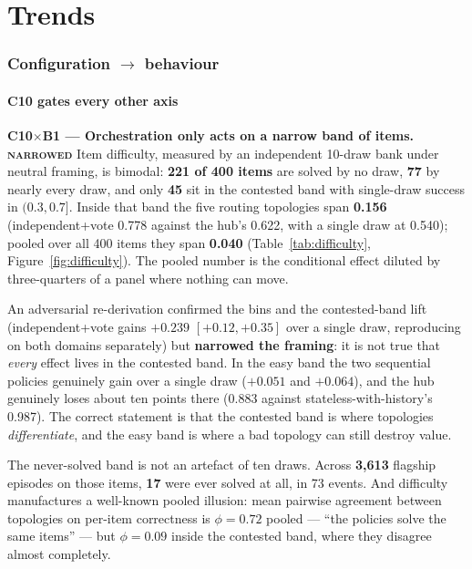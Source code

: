 \documentclass[10pt,a4paper]{article}
\newcommand{\ax}[1]{\textcolor{accent}{\textbf{#1}}}
\newcommand{\bx}[1]{\textcolor{warm}{\textbf{#1}}}
\newcommand{\trend}[1]{\medskip\noindent\textbf{#1}\quad}
\begin{document}
\part{Trends}\label{part:trends}

\section{Configuration \texorpdfstring{$\to$}{->} behaviour}\label{sec:cb}

\subsection{\ax{C10} gates every other axis}\label{sec:difficulty}

\trend{\ax{C10}$\times$\bx{B1} --- Orchestration only acts on a narrow band of items. \textsc{narrowed}}
Item difficulty, measured by an independent 10-draw bank under neutral framing, is bimodal: \textbf{221 of 400 items} are solved by no draw, \textbf{77} by nearly every draw, and only \textbf{45} sit in the contested band with single-draw success in $(0.3,0.7]$. Inside that band the five routing topologies span \textbf{0.156} (independent+vote 0.778 against the hub's 0.622, with a single draw at 0.540); pooled over all 400 items they span \textbf{0.040} (Table~\ref{tab:difficulty}, Figure~\ref{fig:difficulty}). The pooled number is the conditional effect diluted by three-quarters of a panel where nothing can move.

An adversarial re-derivation confirmed the bins and the contested-band lift (independent+vote gains $+0.239$ $[+0.12,+0.35]$ over a single draw, reproducing on both domains separately) but \textbf{narrowed the framing}: it is not true that \emph{every} effect lives in the contested band. In the easy band the two sequential policies genuinely gain over a single draw ($+0.051$ and $+0.064$), and the hub genuinely loses about ten points there (0.883 against stateless-with-history's 0.987). The correct statement is that the contested band is where topologies \emph{differentiate}, and the easy band is where a bad topology can still destroy value.

The never-solved band is not an artefact of ten draws. Across \textbf{3{,}613} flagship episodes on those items, \textbf{17} were ever solved at all, in 73 events. And difficulty manufactures a well-known pooled illusion: mean pairwise agreement between topologies on per-item correctness is $\phi=0.72$ pooled --- ``the policies solve the same items'' --- but $\phi=0.09$ inside the contested band, where they disagree almost completely.
\end{document}
